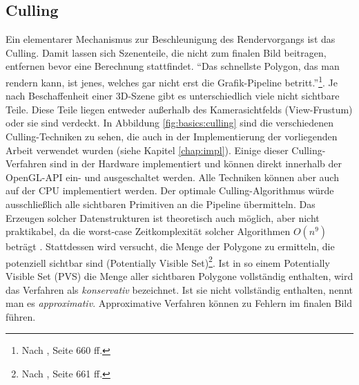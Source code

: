 \subsection{Culling}
\label{sec:basics:algos:culling}
Ein elementarer Mechanismus zur Beschleunigung des Rendervorgangs ist das Culling. Damit lassen sich Szenenteile, die nicht zum finalen Bild beitragen, entfernen bevor eine Berechnung stattfindet. "`Das schnellste Polygon, das man rendern kann, ist jenes, welches gar nicht erst die Grafik-Pipeline betritt."'\footnote{Nach \cite{RTR3}, Seite 660 ff.}. Je nach Beschaffenheit einer 3D-Szene gibt es unterschiedlich viele nicht sichtbare Teile. Diese Teile liegen entweder außerhalb des Kamerasichtfelds (View-Frustum) oder sie sind verdeckt. In Abbildung \ref{fig:basics:culling} sind die verschiedenen Culling-Techniken zu sehen, die auch in der Implementierung der vorliegenden Arbeit verwendet wurden (siehe Kapitel \ref{chap:impl}).
Einige dieser Culling-Verfahren sind in der Hardware implementiert und können direkt innerhalb der OpenGL-API ein- und ausgeschaltet werden. Alle Techniken können aber auch auf der CPU implementiert werden. Der optimale Culling-Algorithmus würde ausschließlich alle sichtbaren Primitiven an die Pipeline übermitteln. Das Erzeugen solcher Datenstrukturen ist theoretisch auch möglich, aber nicht praktikabel, da die worst-case Zeitkomplexität solcher Algorithmen $O(n^{9})$ beträgt \cite{culling}. Stattdessen wird versucht, die Menge der Polygone zu ermitteln, die potenziell sichtbar sind (Potentially Visible Set)\footnote{Nach \cite{RTR3}, Seite 661 ff.}. Ist in so einem Potentially Visible Set (PVS) die Menge aller sichtbaren Polygone vollständig enthalten, wird das Verfahren als \textit{konservativ} bezeichnet. Ist sie nicht vollständig enthalten, nennt man es \textit{approximativ}. Approximative Verfahren können zu Fehlern im finalen Bild führen.

